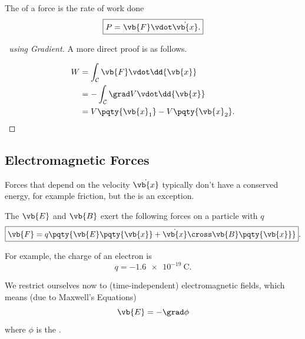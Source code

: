 \begin{definition}[Power]
    \label{def:power}%
    The  of a force is the rate of work done
    \begin{equation}
        \boxed{P = \vb{F} \vdot \dot{\vb{x}}.}
    \end{equation}
\end{definition}

\begin{proof}[\proofname\ using Gradient]
    A more direct proof is as follows.

    \begin{subequations}\begin{align}
        W &= \int_{\mathcal{C}} \vb{F} \vdot \dd{\vb{x}} \\
        &= - \int_{\mathcal{C}} \grad V \vdot \dd{\vb{x}} \\
        &= V \pqty{\vb{x}_1} - V \pqty{\vb{x}_2}.
    \end{align}\end{subequations}
\end{proof}

\subsection{Electromagnetic Forces}

Forces that depend on the velocity \(\dot{\vb{x}}\) typically don't have a conserved energy, for example friction, but the  is an exception.

\begin{definition}
    \label{def:em-force-charged-particle}%
    The  \(\vb{E}\) and \(\vb{B}\) exert the following forces on a particle with  \(q\)
    \begin{equation}
        \boxed{\vb{F} = q \pqty{\vb{E} \pqty{\vb{x}} + \dot{\vb{x}} \cross \vb{B} \pqty{\vb{x}}}}.
    \end{equation}
\end{definition}

For example, the charge of an electron is
\begin{equation}
    q = \SI{-1.6e-19}{\coulomb}.
\end{equation}

We restrict ourselves now to  (time-independent) electromagnetic fields, which means (due to Maxwell's Equations)
\begin{equation}
    \vb{E} = - \grad \phi
\end{equation}
where \(\phi\) is the .

